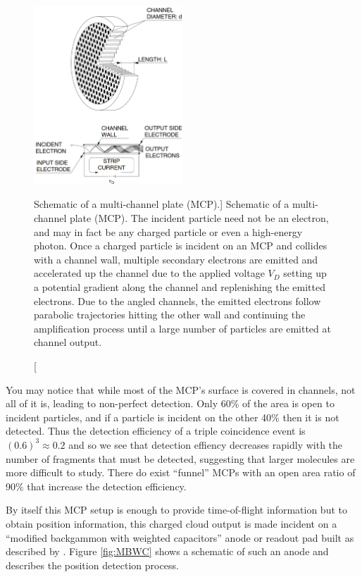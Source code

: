 \begin{figure}
  \centering
  \includegraphics[width=0.50\textwidth]{gfx/MCP}
  \caption
  [Schematic of a multi-channel plate (MCP).]
  {Schematic of a multi-channel plate (MCP). The incident particle need not be an electron, and may in fact be any charged particle or even a high-energy photon. Once a charged particle is incident on an MCP and collides with a channel wall, multiple secondary electrons are emitted and accelerated up the channel due to the applied voltage $V_D$ setting up a potential gradient along the channel and replenishing the emitted electrons. Due to the angled channels, the emitted electrons follow parabolic trajectories hitting the other wall and continuing the amplification process until a large number of particles are emitted at channel output.}
  \label{fig:MCP}
\end{figure}

You may notice that while most of the MCP's surface is covered in channels, not all of it is, leading to non-perfect detection. Only 60\% of the area is open to incident particles, and if a particle is incident on the other 40\% then it is not detected. Thus the detection efficiency of a triple coincidence event is $(0.6)^3 \approx 0.2$ and so we see that detection effiency decreases rapidly with the number of fragments that must be detected, suggesting that larger molecules are more difficult to study. There do exist ``funnel'' MCPs with an open area ratio of 90\% that increase the detection efficiency.

By itself this MCP setup is enough to provide time-of-flight information but to obtain position information, this charged cloud output is made incident on a ``modified backgammon with weighted capacitors'' anode or readout pad built as described by \citet{Veshapidze02}. Figure \ref{fig:MBWC} shows a schematic of such an anode and describes the position detection process.

